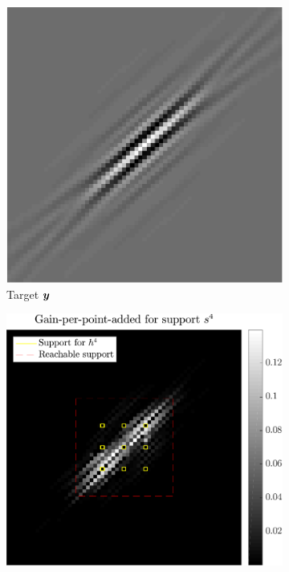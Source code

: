 \begin{figure}[!h]\centering
	\begin{subfigure}[b]{0.30\textwidth}\centering
	\includegraphics[width=\linewidth]{figures/xp/n4/xp_128x128_sc2_angl1_K3_S3_node4_target.pdf}
	\caption{Target $\bm{y}$}
	\end{subfigure}
	\begin{subfigure}[b]{0.34\linewidth}\centering
	\includegraphics[width=\linewidth]{figures/xp/n4/xp_128x128_sc2_angl1_K3_S3_node4_objmatrix.pdf}

\end{subfigure}
\end{figure}
